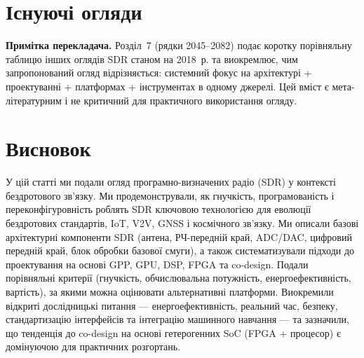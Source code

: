 \documentclass[journal]{IEEEtran}
\begin{document}
\section{Існуючі огляди}
\label{old}

\textbf{Примітка перекладача.} Розділ~7 (рядки 2045--2082) подає коротку порівняльну таблицю інших оглядів SDR станом на 2018~р. та виокремлює, чим запропонований огляд відрізняється: системний фокус на архітектурі + проектуванні + платформах + інструментах в одному джерелі. Цей вміст є мета-літературним і не критичний для практичного використання огляду.


\section{Висновок}
\label{conc}

У цій статті ми подали огляд програмно-визначених радіо (SDR) у контексті бездротового зв'язку. Ми продемонстрували, як гнучкість, програмованість і переконфігуровність роблять SDR ключовою технологією для еволюції бездротових стандартів, IoT, V2V, GNSS і космічного зв'язку.
Ми описали базові архітектурні компоненти SDR (антена, РЧ-передній край, ADC/DAC, цифровий передній край, блок обробки базової смуги), а також систематизували підходи до проектування на основі GPP, GPU, DSP, FPGA та co-design.
Подали порівняльні критерії (гнучкість, обчислювальна потужність, енергоефективність, вартість), за якими можна оцінювати альтернативні платформи.
Виокремили відкриті дослідницькі питання — енергоефективність, реальний час, безпеку, стандартизацію інтерфейсів та інтеграцію машинного навчання — та зазначили, що тенденція до co-design на основі гетерогенних SoC (FPGA + процесор) є домінуючою для практичних розгортань.




\end{document}
